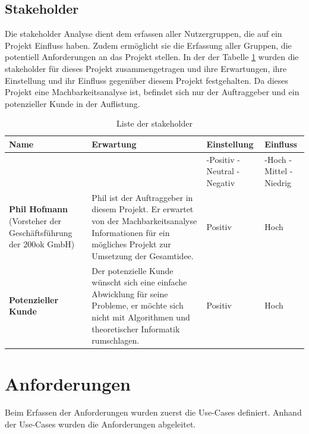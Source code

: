 \newpage
\subsection{Stakeholder}\label{stakeholder}
Die \gls{stakeholder} Analyse dient dem erfassen aller Nutzergruppen, die auf ein Projekt Einfluss haben. Zudem ermöglicht sie die Erfassung aller Gruppen, die potentiell 
Anforderungen an das Projekt stellen. In der der Tabelle \ref{table:stakeholder} wurden die \gls{stakeholder} für dieses Projekt zusammengetragen und ihre Erwartungen, ihre 
Einstellung und ihr Einfluss gegenüber diesem Projekt festgehalten. Da dieses Projekt eine Machbarkeitsanalyse ist, befindet sich nur der Auftraggeber und ein potenzieller Kunde in der 
Auflistung.

\begin{table}[ht]
\centering
  \begin{tabular}{ p{5cm} | p{5cm} | p{1.5cm} | p{1.5cm} }
	\hline
	\rowcolor{darkgray}
	\textbf{Name}					&	\textbf{Erwartung}	&	\textbf{Einstellung} 	&	\textbf{Einfluss}	\\ \hline
	\rowcolor{gray}
								&				&	-Positiv \mbox{-Neutral} \mbox{-Negativ} 	&	-Hoch \mbox{-Mittel} \mbox{-Niedrig} \\ \hline
	\textbf{Phil Hofmann} (Vorsteher der Geschäftsführung der 200ok GmbH)						
								&	Phil ist der Auftraggeber in diesem Projekt. Er erwartet von der Machbarkeitsanalyse Informationen für ein mögliches Projekt zur 
									Umsetzung der Gesamtidee.
												& 	Positiv		&	Hoch		\\ \hline
	\textbf{Potenzieller Kunde}
								&	Der potenzielle Kunde wünscht sich eine einfache Abwicklung für seine Probleme, er möchte sich nicht mit Algorithmen und 
									theoretischer Informatik rumschlagen.
												& 	Positiv		&	Hoch		\\ \hline
  \end{tabular}
   \caption{Liste der \gls{stakeholder}}\label{table:stakeholder}
\end{table}

\newpage
\section{Anforderungen}\label{sec.anfoderungen}
Beim Erfassen der Anforderungen wurden zuerst die Use-Cases definiert. Anhand der Use-Cases wurden die Anforderungen abgeleitet.

